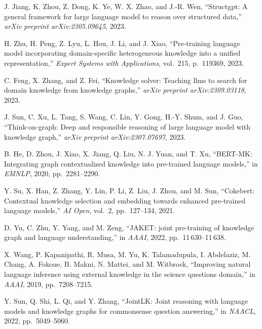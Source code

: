 \begin{enumerate}[leftmargin=2em,label={[\arabic*]}]
\item J. Jiang, K. Zhou, Z. Dong, K. Ye, W. X. Zhao, and J.-R. Wen, ``Structgpt: A general framework for large language model to reason over structured data,'' \textit{arXiv preprint arXiv:2305.09645}, 2023.

\item H. Zhu, H. Peng, Z. Lyu, L. Hou, J. Li, and J. Xiao, ``Pre-training language model incorporating domain-specific heterogeneous knowledge into a unified representation,'' \textit{Expert Systems with Applications}, vol.~215, p.~119369, 2023.

\item C. Feng, X. Zhang, and Z. Fei, ``Knowledge solver: Teaching llms to search for domain knowledge from knowledge graphs,'' \textit{arXiv preprint arXiv:2309.03118}, 2023.

\item J. Sun, C. Xu, L. Tang, S. Wang, C. Lin, Y. Gong, H.-Y. Shum, and J. Guo, ``Think-on-graph: Deep and responsible reasoning of large language model with knowledge graph,'' \textit{arXiv preprint arXiv:2307.07697}, 2023.

\item B. He, D. Zhou, J. Xiao, X. Jiang, Q. Liu, N. J. Yuan, and T. Xu, ``BERT-MK: Integrating graph contextualized knowledge into pre-trained language models,'' in \textit{EMNLP}, 2020, pp.~2281--2290.

\item Y. Su, X. Han, Z. Zhang, Y. Lin, P. Li, Z. Liu, J. Zhou, and M. Sun, ``Cokebert: Contextual knowledge selection and embedding towards enhanced pre-trained language models,'' \textit{AI Open}, vol.~2, pp.~127--134, 2021.

\item D. Yu, C. Zhu, Y. Yang, and M. Zeng, ``JAKET: joint pre-training of knowledge graph and language understanding,'' in \textit{AAAI}, 2022, pp.~11\,630--11\,638.

\item X. Wang, P. Kapanipathi, R. Musa, M. Yu, K. Talamadupula, I. Abdelaziz, M. Chang, A. Fokoue, B. Makni, N. Mattei, and M. Witbrock, ``Improving natural language inference using external knowledge in the science questions domain,'' in \textit{AAAI}, 2019, pp.~7208--7215.

\item Y. Sun, Q. Shi, L. Qi, and Y. Zhang, ``JointLK: Joint reasoning with language models and knowledge graphs for commonsense question answering,'' in \textit{NAACL}, 2022, pp.~5049--5060.


\end{enumerate}

